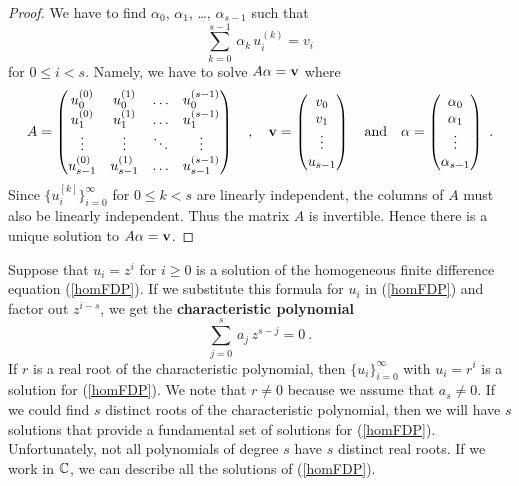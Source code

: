 \begin{proof}
We have to find $\alpha_0$, $\alpha_1$, \ldots, $\alpha_{s-1}$ such that
\[
\sum_{k=0}^{s-1} \,\alpha_k \, u_i^{(k)} = v_i
\]
for $0 \leq i < s$.  Namely, we have to solve
$A\mathbf{\alpha} = \mathbf{v}$ where
\[
A = \begin{pmatrix}
u_0^{(0)} & u_0^{(1)} & \ldots & u_0^{(s-1)} \\
u_1^{(0)} & u_1^{(1)} & \ldots & u_1^{(s-1)} \\
 \vdots & \vdots & \ddots & \vdots \\
u_{s-1}^{(0)} & u_{s-1}^{(1)} & \ldots & u_{s-1}^{(s-1)}
\end{pmatrix}
\quad , \quad 
\mathbf{v} = \begin{pmatrix}
v_0 \\
v_1 \\
\vdots \\
u_{s-1}
\end{pmatrix}
\quad \text{and} \quad
\mathbf{\alpha} = \begin{pmatrix}
\alpha_0 \\
\alpha_1 \\
\vdots \\
\alpha_{s-1}
\end{pmatrix} \ .
\]
Since $\{ u_i^{[k]} \}_{i=0}^\infty$ for $0\leq k < s$ are
linearly independent, the columns of $A$ must also be linearly
independent.  Thus the matrix $A$ is invertible.  Hence there is a
unique solution to $A\mathbf{\alpha} = \mathbf{v}$.
\end{proof}

Suppose that $u_i = z^i$ for $i \geq 0$ is a solution of
the homogeneous finite difference equation (\ref{homFDP}).  If we
substitute this formula for $u_i$ in (\ref{homFDP}) and factor out
$z^{i-s}$, we get the
{\bfseries characteristic polynomial} 
\begin{equation}\label{charpolFDE}
\sum_{j=0}^s \,a_j \, z^{s-j} = 0 \ .
\end{equation}
If $r$ is a real root of the characteristic polynomial, then
$\{ u_i \}_{i=0}^\infty$ with $u_i = r^i$ is a solution for
(\ref{homFDP}).  We note that $r \neq 0$ because we assume that
$a_s \neq 0$.  If we could find $s$ distinct roots of the
characteristic polynomial, then we will have $s$ solutions that
provide a fundamental set of solutions for (\ref{homFDP}).
Unfortunately, not all polynomials of degree $s$ have $s$ distinct
real roots.  If we work in $\mathbb{C}$, we can describe all the solutions
of (\ref{homFDP}).

